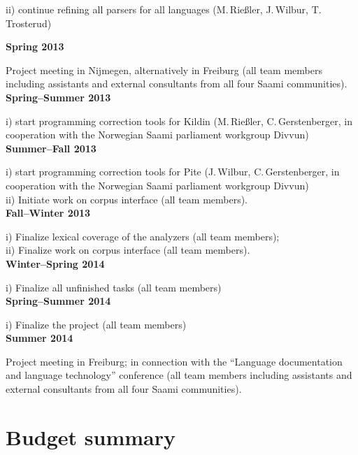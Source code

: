 \documentclass[a4paper,12pt]{article}
\begin{document}
{{\begin{flushleft}
ii) continue refining all parsers for all languages (M.\,Rießler, J.\,Wilbur, T.\,Trosterud)

\noindent \textbf{Spring 2013} 

Project meeting in Nijmegen, alternatively in Freiburg (all team members including assistants and external consultants from all four Saami communities).\\

\noindent \textbf{Spring–Summer 2013} 

i) start programming correction tools for Kildin (M.\,Rießler, C.\,Gerstenberger, in cooperation with the Norwegian Saami parliament workgroup Divvun)\\

\noindent \textbf{Summer–Fall 2013}

i) start programming correction tools for Pite (J.\,Wilbur, C.\,Gerstenberger, in cooperation with the Norwegian Saami parliament workgroup Divvun)\\

ii) Initiate work on corpus interface (all team members).\\

\noindent \textbf{Fall–Winter 2013}

i) Finalize lexical coverage of the analyzers (all team members);\\

ii) Finalize work on corpus interface (all team members).\\

\noindent \textbf{Winter–Spring 2014}

i) Finalize all unfinished tasks (all team members)\\

\noindent \textbf{Spring–Summer 2014}

i) Finalize the project (all team members)\\

\noindent \textbf{Summer 2014} 

Project meeting in Freiburg; in connection with the “Language documentation and language technology” conference (all team members including assistants and external consultants from all four Saami communities).
\end{flushleft}

\newpage
\section{Budget summary}

}}
\end{document}
